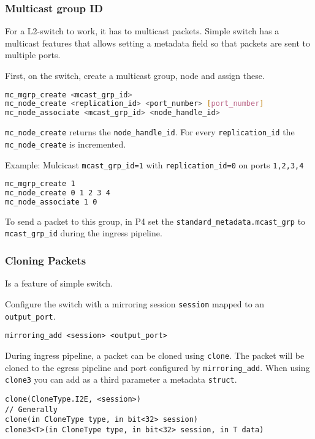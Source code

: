 \documentclass[a4paper, fontsize=8pt, landscape, DIV=1]{scrartcl}
\begin{document}
\begin{multicols*}{3}
  \subsubsection{Multicast group ID}
  For a L2-switch to work, it has to multicast packets. Simple switch has a multicast features that
  allows setting a metadata field so that packets are sent to multiple ports.

  First, on the switch, create a multicast group, node and assign these.
  \begin{lstlisting}[language=bash]
mc_mgrp_create <mcast_grp_id>
mc_node_create <replication_id> <port_number> [port_number]
mc_node_associate <mcast_grp_id> <node_handle_id>\end{lstlisting}
  
  \texttt{mc\_node\_create} returns the \texttt{node\_handle\_id}. For every \texttt{replication\_id} the \texttt{mc\_node\_create} is incremented.

  Example: Mulcicast \texttt{mcast\_grp\_id=1} with \texttt{replication\_id=0} on ports \texttt{1,2,3,4} 
  \begin{lstlisting}[language=bash]
mc_mgrp_create 1
mc_node_create 0 1 2 3 4
mc_node_associate 1 0\end{lstlisting}

  To send a packet to this group, in P4 set the \texttt{standard\_metadata.mcast\_grp} to \texttt{mcast\_grp\_id} during the ingress pipeline.

  \subsubsection{Cloning Packets}
  Is a feature of simple switch.

  Configure the switch with a mirroring session \texttt{session} mapped to an \texttt{output\_port}.
  \begin{lstlisting}[style=P4style]
mirroring_add <session> <output_port>\end{lstlisting}

  During ingress pipeline, a packet can be cloned using \texttt{clone}. The packet will be cloned to the egress pipeline and port configured by \texttt{mirroring\_add}. When using \texttt{clone3} you can add as a third parameter a metadata \texttt{struct}.
  \begin{lstlisting}[style=P4style]
clone(CloneType.I2E, <session>)
// Generally
clone(in CloneType type, in bit<32> session)
clone3<T>(in CloneType type, in bit<32> session, in T data)\end{lstlisting}


\end{multicols*}
\end{document}

